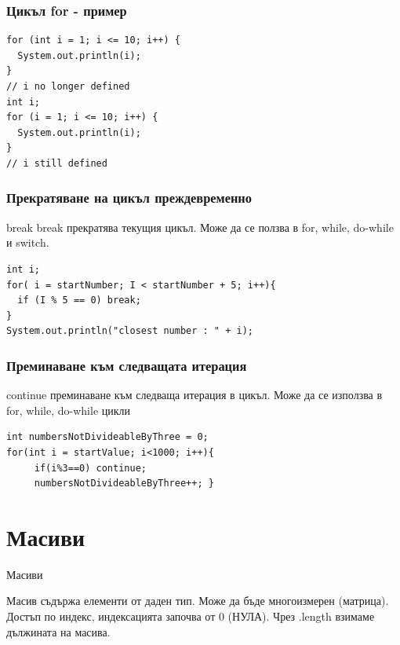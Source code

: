 \documentclass{beamer}
\begin{document}
\begin{frame}[fragile]
  \frametitle{Цикъл for - пример}
  \transdissolve
\begin{lstlisting}
for (int i = 1; i <= 10; i++) {
  System.out.println(i);
}
// i no longer defined
int i;
for (i = 1; i <= 10; i++) {
  System.out.println(i);
}
// i still defined
\end{lstlisting}
\end{frame}

\begin{frame}[fragile]
  \frametitle{Прекратяване на цикъл преждевременно}
  \transdissolve
  \transdissolve
  \begin{block}{break}
    break прекратява текущия цикъл. Може
    да се ползва в for, while, do-while и
    switch.
  \end{block}
\begin{lstlisting}
int i;
for( i = startNumber; I < startNumber + 5; i++){
  if (I % 5 == 0) break; 
}
System.out.println("closest number : " + i);
\end{lstlisting}
\end{frame}

\begin{frame}[fragile]
  \frametitle{Преминаване към следващата итерация}
  \transdissolve
  \transglitter[direction=90]
  \begin{block}{continue}
    преминаване към следваща
    итерация в цикъл. Може да се
    използва в for, while, do-while цикли
  \end{block}
\begin{lstlisting}
int numbersNotDivideableByThree = 0;
for(int i = startValue; i<1000; i++){
     if(i%3==0) continue;
     numbersNotDivideableByThree++; }
\end{lstlisting}
\end{frame}

\section{Масиви}

\begin{frame}{Масиви}
  \transdissolve
  \begin{block}{Масив}
    съдържа елементи от даден
    тип. Може да бъде многоизмерен
    (матрица). Достъп по индекс,
    индексацията започва от 0 (НУЛА).
    Чрез .length взимаме дължината на
    масива.
  \end{block}
\end{frame}
\end{document}
